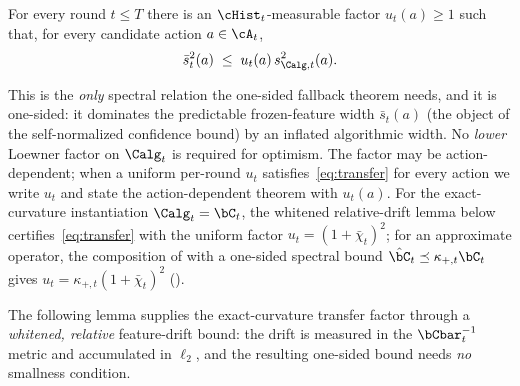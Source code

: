 \begin{assumption}\label{asm:transfer}
For every round $t\le T$ there is an $\cHist_t$-measurable factor
$u_t(a)\ge 1$ such that, for every candidate action $a\in\cA_t$,
\begin{equation}\label{eq:transfer}
  \bar s_t^2(a)\;\le\;u_t(a)\,s_{\Calg,t}^2(a).
\end{equation}
\end{assumption}

This is the \emph{only} spectral relation the one-sided fallback theorem needs, and it is
one-sided: it dominates the predictable frozen-feature width $\bar s_t(a)$
(the object of the self-normalized confidence bound) by an inflated
algorithmic width.  No \emph{lower} Loewner factor on $\Calg_t$ is required
for optimism.  The factor may be action-dependent; when a uniform per-round
$u_t$ satisfies~\eqref{eq:transfer} for every action we write $u_t$ and
state the action-dependent theorem with $u_t(a)$.
For the exact-curvature instantiation $\Calg_t=\bC_t$, the whitened
relative-drift lemma below certifies~\eqref{eq:transfer} with the uniform
factor $u_t=(1+\bar\chi_t)^2$; for an approximate operator, the composition
of  with a one-sided spectral bound
$\hat\bC_t\preceq\kappa_{+,t}\bC_t$ gives
$u_t=\kappa_{+,t}(1+\bar\chi_t)^2$ ().

The following lemma supplies the exact-curvature transfer factor through a
\emph{whitened, relative} feature-drift bound: the drift is measured in the
$\bCbar_t^{-1}$ metric and accumulated in $\ell_2$, and the resulting
one-sided bound needs \emph{no} smallness condition.

